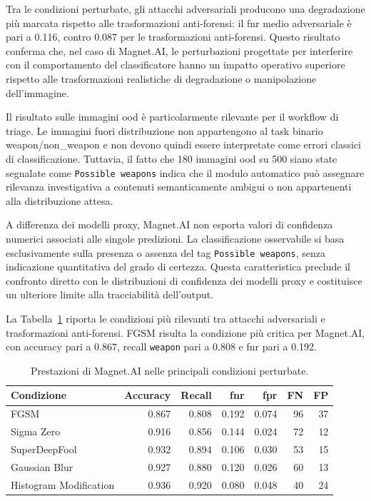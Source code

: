 Tra le condizioni perturbate, gli attacchi adversariali producono una
degradazione più marcata rispetto alle trasformazioni anti-forensi: il
\gls{fnr} medio adversariale è pari a 0.116, contro 0.087 per le trasformazioni
anti-forensi. Questo risultato conferma che, nel caso di Magnet.AI, le
perturbazioni progettate per interferire con il comportamento del classificatore
hanno un impatto operativo superiore rispetto alle trasformazioni realistiche di
degradazione o manipolazione dell'immagine.

Il risultato sulle immagini \gls{ood} è particolarmente rilevante per il
workflow di triage. Le immagini fuori distribuzione non appartengono al task
binario weapon/non\_weapon e non devono quindi essere interpretate come errori
classici di classificazione. Tuttavia, il fatto che 180 immagini \gls{ood} su
500 siano state segnalate come \texttt{Possible weapons} indica che il modulo
automatico può assegnare rilevanza investigativa a contenuti semanticamente
ambigui o non appartenenti alla distribuzione attesa.

A differenza dei modelli proxy, Magnet.AI non esporta valori di confidenza
numerici associati alle singole predizioni. La classificazione osservabile si
basa esclusivamente sulla presenza o assenza del tag \texttt{Possible weapons},
senza indicazione quantitativa del grado di certezza. Questa caratteristica
preclude il confronto diretto con le distribuzioni di confidenza dei modelli
proxy e costituisce un ulteriore limite alla tracciabilità dell'output.

La Tabella~\ref{tab:results-magnet-attack-metrics} riporta le condizioni più
rilevanti tra attacchi adversariali e trasformazioni anti-forensi. FGSM risulta
la condizione più critica per Magnet.AI, con accuracy pari a 0.867, recall
\texttt{weapon} pari a 0.808 e \gls{fnr} pari a 0.192.

\begin{table}[H]
\centering
\caption{Prestazioni di Magnet.AI nelle principali condizioni perturbate.}
\label{tab:results-magnet-attack-metrics}
\small
\begin{tabular}{l r r r r r r}
\toprule
\textbf{Condizione} &
\textbf{Accuracy} &
\textbf{Recall} &
\textbf{\gls{fnr}} &
\textbf{\gls{fpr}} &
\textbf{FN} &
\textbf{FP} \\
\midrule

FGSM &
0.867 &
0.808 &
0.192 &
0.074 &
96 &
37 \\

Sigma Zero &
0.916 &
0.856 &
0.144 &
0.024 &
72 &
12 \\

SuperDeepFool &
0.932 &
0.894 &
0.106 &
0.030 &
53 &
15 \\

Gaussian Blur &
0.927 &
0.880 &
0.120 &
0.026 &
60 &
13 \\

Histogram Modification &
0.936 &
0.920 &
0.080 &
0.048 &
40 &
24 \\

\bottomrule
\end{tabular}
\end{table}

